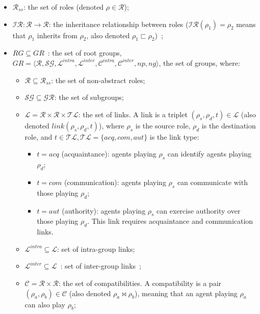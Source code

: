         \begin{itemize}
          \item $\mathcal{R}_{ss}$: the set of roles (denoted $\rho \in \mathcal{R}$);
          \item $\mathcal{IR}: \mathcal{R} \rightarrow \mathcal{R}$: the inheritance relationship between roles ($\mathcal {IR}(\rho_1) = \rho_2$ means that $\rho_1$ inherits from $\rho_2$, also denoted $\rho_1 \sqsubset \rho_2$)~;
          \item $RG \subseteq GR$~: the set of root groups, $GR = \langle \mathcal{R}, \mathcal{SG}, \mathcal{L}^{intra}, \mathcal{L}^{inter}, \mathcal{C}^{intra}, \mathcal{C}^{inter}, np, ng \rangle$, the set of groups, where:
                \begin{itemize}
                  \item $\mathcal{R} \subseteq \mathcal{R}_{ss}$: the set of non-abstract roles;
                  \item $\mathcal{SG} \subseteq \mathcal{GR}$: the set of subgroups;
                  \item $\mathcal{L} = \mathcal{R} \times \mathcal{R} \times \mathcal{TL}$: the set of links. A link is a triplet $(\rho_s,\rho_d,t) \in \mathcal{L}$ (also denoted $link(\rho_s,\rho_d,t)$), where $\rho_s$ is the source role, $\rho_d$ is the destination role, and $t \in \mathcal{TL}, \mathcal{TL} = \{acq, com, aut\}$ is the link type:
                        \begin{itemize}
                          \item $t = acq$ (acquaintance): agents playing $\rho_s$ can identify agents playing $\rho_d$;
                          \item $t = com$ (communication): agents playing $\rho_s$ can communicate with those playing $\rho_d$;
                          \item $t = aut$ (authority): agents playing $\rho_s$ can exercise authority over those playing $\rho_d$.
                                This link requires acquaintance and communication links.
                        \end{itemize}
                  \item $\mathcal{L}^{intra} \subseteq \mathcal{L}$: set of intra-group links;
                  \item $\mathcal{L}^{inter} \subseteq \mathcal{L} $~: set of inter-group links~;
                  \item $\mathcal{C} = \mathcal{R} \times \mathcal {R}$: the set of compatibilities. A compatibility is a pair $(\rho_a, \rho_b) \in \mathcal{C}$ (also denoted $\rho_a \bowtie \rho_b$), meaning that an agent playing $\rho_a$ can also play $\rho_b$;

\end{itemize}
\end{itemize}
